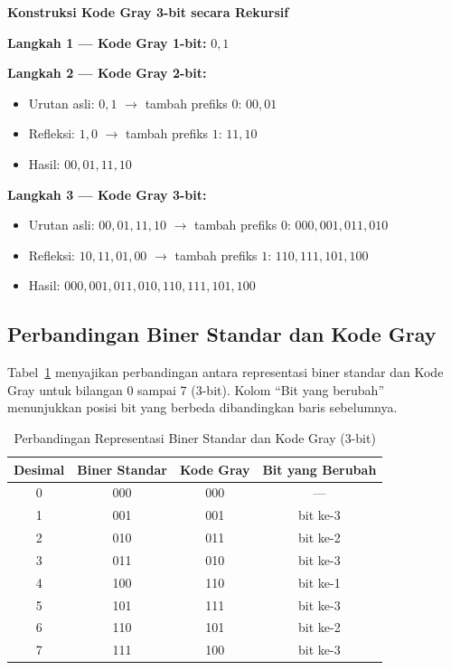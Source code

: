 \begin{contoh}
\textbf{Konstruksi Kode Gray 3-bit secara Rekursif}

\textbf{Langkah 1 --- Kode Gray 1-bit:} $0, 1$

\textbf{Langkah 2 --- Kode Gray 2-bit:}
\begin{itemize}
  \item Urutan asli: $0, 1$ $\rightarrow$ tambah prefiks $0$: $00, 01$
  \item Refleksi: $1, 0$ $\rightarrow$ tambah prefiks $1$: $11, 10$
  \item Hasil: $00, 01, 11, 10$
\end{itemize}

\textbf{Langkah 3 --- Kode Gray 3-bit:}
\begin{itemize}
  \item Urutan asli: $00, 01, 11, 10$ $\rightarrow$ tambah prefiks $0$: $000, 001, 011, 010$
  \item Refleksi: $10, 11, 01, 00$ $\rightarrow$ tambah prefiks $1$: $110, 111, 101, 100$
  \item Hasil: $000, 001, 011, 010, 110, 111, 101, 100$
\end{itemize}
\end{contoh}

\subsection{Perbandingan Biner Standar dan Kode Gray}

Tabel~\ref{tab:biner-vs-gray} menyajikan perbandingan antara representasi biner standar dan Kode Gray untuk bilangan 0 sampai 7 (3-bit). Kolom ``Bit yang berubah'' menunjukkan posisi bit yang berbeda dibandingkan baris sebelumnya.

\begin{table}[htbp]
\centering
\renewcommand{\arraystretch}{1.3}
\begin{tabular}{|c|c|c|c|}
\hline
\textbf{Desimal} & \textbf{Biner Standar} & \textbf{Kode Gray} & \textbf{Bit yang Berubah} \\ \hline
0 & 000 & 000 & --- \\ \hline
1 & 001 & 001 & bit ke-3 \\ \hline
2 & 010 & 011 & bit ke-2 \\ \hline
3 & 011 & 010 & bit ke-3 \\ \hline
4 & 100 & 110 & bit ke-1 \\ \hline
5 & 101 & 111 & bit ke-3 \\ \hline
6 & 110 & 101 & bit ke-2 \\ \hline
7 & 111 & 100 & bit ke-3 \\ \hline
\end{tabular}
\caption{Perbandingan Representasi Biner Standar dan Kode Gray (3-bit)}
\label{tab:biner-vs-gray}
\end{table}

